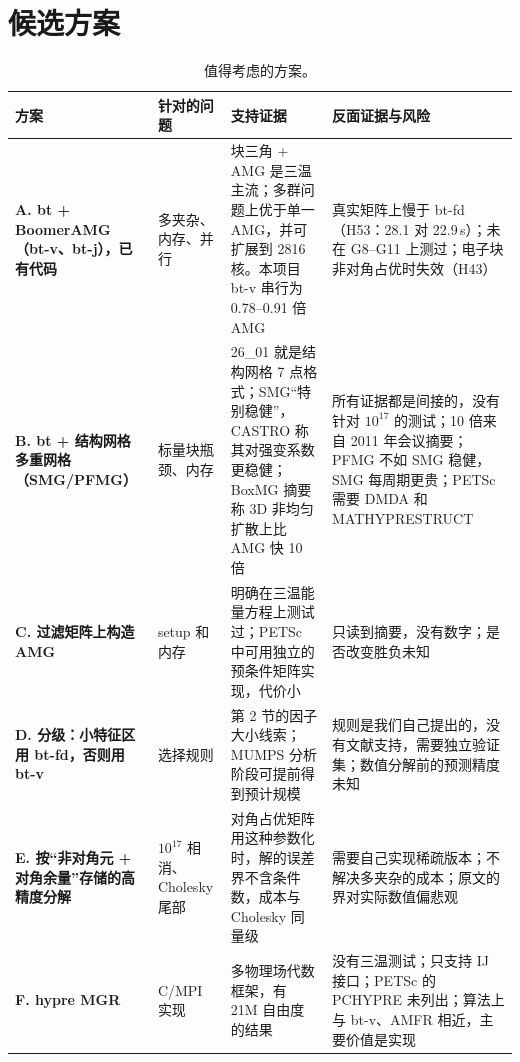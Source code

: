 \documentclass[11pt,a4paper]{ctexart}
\begin{document}
\section{候选方案}
\begin{table}[H]
\centering\footnotesize
\begin{tabular}{p{3.0cm}p{2.3cm}p{5.2cm}p{4.6cm}}
\toprule
方案 & 针对的问题 & 支持证据 & 反面证据与风险 \\
\midrule
\textbf{A. bt + BoomerAMG（bt-v、bt-j），已有代码} & 多夹杂、内存、并行 & 块三角 + AMG 是三温主流\cite{shu2021,yue2022}；多群问题上优于单一 AMG\cite{yue2021}，并可扩展到 2816 核\cite{yue2024}。本项目 bt-v 串行为 0.78--0.91 倍 AMG & 真实矩阵上慢于 bt-fd（H53：28.1 对 22.9\,s）；未在 G8--G11 上测过；电子块非对角占优时失效（H43）\\
\textbf{B. bt + 结构网格多重网格（SMG/PFMG）} & 标量块瓶颈、内存 & 26\_01 就是结构网格 7 点格式\cite{sc26}；SMG“特别稳健”\cite{hypre-smg}，CASTRO 称其对强变系数更稳健\cite{castro}；BoxMG 摘要称 3D 非均匀扩散上比 AMG 快 10 倍\cite{copper2011} & 所有证据都是间接的，没有针对 $10^{17}$ 的测试；10 倍来自 2011 年会议摘要；PFMG 不如 SMG 稳健，SMG 每周期更贵\cite{hypre-smg}；PETSc 需要 DMDA 和 MATHYPRESTRUCT\cite{petsc-pfmg} \\
\textbf{C. 过滤矩阵上构造 AMG} & setup 和内存 & 明确在三温能量方程上测试过\cite{ye2021}；PETSc 中可用独立的预条件矩阵实现，代价小 & 只读到摘要，没有数字；是否改变胜负未知 \\
\textbf{D. 分级：小特征区用 bt-fd，否则用 bt-v} & 选择规则 & 第 2 节的因子大小线索；MUMPS 分析阶段可提前得到预计规模 & 规则是我们自己提出的，没有文献支持，需要独立验证集；数值分解前的预测精度未知 \\
\textbf{E. 按“非对角元 + 对角余量”存储的高精度分解} & $10^{17}$ 相消、Cholesky 尾部 & 对角占优矩阵用这种参数化时，解的误差界不含条件数，成本与 Cholesky 同量级\cite{ye2017,alfa2002,dailey2014} & 需要自己实现稀疏版本；不解决多夹杂的成本；原文的界对实际数值偏悲观 \\
\textbf{F. hypre MGR} & C/MPI 实现 & 多物理场代数框架，有 21M 自由度的结果\cite{bui2021,hypre-mgr} & 没有三温测试；只支持 IJ 接口；PETSc 的 PCHYPRE 未列出\cite{petsc-hypre}；算法上与 bt-v、AMFR 相近，主要价值是实现 \\
\bottomrule
\end{tabular}
\caption{值得考虑的方案。}
\end{table}
\end{document}
